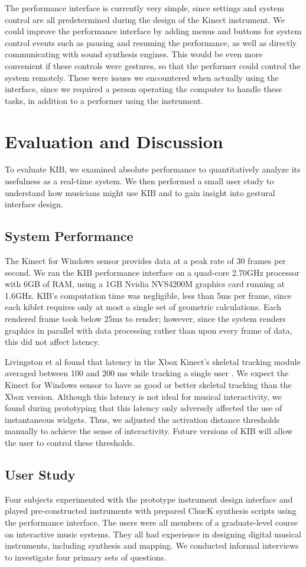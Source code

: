 \documentclass{nime-alternate}
\begin{document}
The performance interface is currently very simple, since settings and system control are all predetermined
during the design of the Kinect instrument. We could improve the performance interface by
adding menus and buttons for system control events such as pausing and resuming the performance, as
well as directly communicating with sound synthesis engines. This would be even more convenient if these
controls were gestures, so that the performer could control the system remotely. 
These were issues we encountered when actually
using the interface, since we required a person operating the computer to handle these tasks, in
addition to a performer using the instrument.
\section{Evaluation and Discussion}
To evaluate KIB, we examined absolute performance to quantitatively analyze its usefulness as a real-time system. We then
performed a small user study to understand how musicians might use KIB and to gain insight into gestural interface design.
\subsection{System Performance}
The Kinect for Windows sensor provides data at a peak rate of 30 frames per second. We ran
the KIB performance interface on a quad-core 2.70GHz processor with 6GB of RAM, using a
1GB Nvidia NVS4200M graphics card running at 1.6GHz. KIB's
computation time was negligible, less than 5ms per frame, since each kiblet requires only at
most a single set of geometric calculations. Each rendered frame took below 25ms to render; however,
since the system renders graphics in parallel with data processing rather than upon every frame of data,
this did not affect latency.

Livingston et al found that latency in the Xbox Kinect's skeletal tracking module
averaged between 100 and 200 ms while
tracking a single user \cite{livingston2012performance}. We expect the Kinect for Windows
sensor to have as good or better skeletal tracking than the Xbox version. Although
this latency is not ideal for musical interactivity, we found during prototyping that this
latency only adversely affected the use of instantaneous widgets. Thus, we adjusted the activation distance thresholds
manually to achieve the sense of interactivity. Future versions of KIB will allow the user to
control these thresholds.
\subsection{User Study}
Four subjects experimented with the prototype instrument design interface
and played pre-constructed instruments with prepared ChucK synthesis scripts using the performance interface.
The users were all members of a graduate-level course on interactive music systems. They all had
experience in designing digital musical instruments, including synthesis and mapping. 
We conducted informal interviews to investigate four primary sets of questions.
\end{document}
